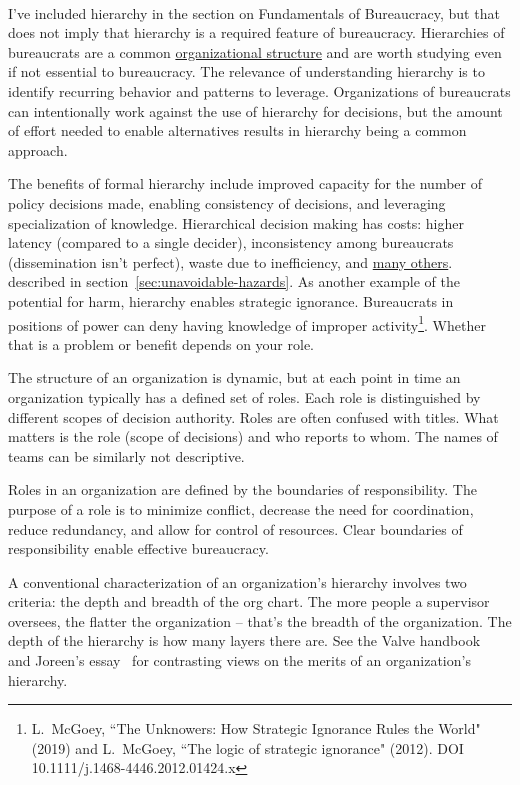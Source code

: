\ \\

I've included hierarchy in the section on Fundamentals of Bureaucracy, but that does not imply that hierarchy is a required feature of bureaucracy. Hierarchies of bureaucrats are a common \href{https://en.wikipedia.org/wiki/Organizational_structure}{organizational structure} and are worth studying even if not essential to bureaucracy. The relevance of understanding hierarchy is to identify recurring behavior and patterns to leverage.
Organizations of bureaucrats can intentionally work against the use of hierarchy for decisions, but the amount of effort needed to enable alternatives results in hierarchy being a common approach.

The benefits of formal hierarchy include improved capacity for the number of policy decisions made, enabling consistency of decisions, and leveraging specialization of knowledge. 
Hierarchical decision making has costs: higher latency (compared to a single decider), inconsistency among bureaucrats (dissemination isn't perfect), waste due to inefficiency, and 
\hyperref[sec:unavoidable-hazards]{many others}.
\ifsectionref
described in section~\ref{sec:unavoidable-hazards}. 
\fi
As another example of the potential for harm, hierarchy enables strategic ignorance. Bureaucrats in positions of power can deny having knowledge of improper activity\footnote{L.~McGoey, ``The Unknowers: How Strategic Ignorance Rules the World" (2019)
and 
L.~McGoey, ``The logic of strategic ignorance" (2012). DOI 
10.1111/j.1468-4446.2012.01424.x
}. Whether that is a problem or benefit depends on your role. 



The structure of an organization is dynamic, but at each point in time an organization typically has a defined set of roles. Each role is distinguished by different scopes of decision authority. 
Roles are often confused with titles. What matters is the role (scope of decisions) and who reports to whom. The names of teams can be similarly not descriptive.




Roles in an organization are defined by the boundaries of responsibility. The purpose of a role is to minimize conflict, decrease the need for coordination, reduce redundancy, and allow for control of resources. Clear boundaries of responsibility  enable effective bureaucracy. 


A conventional characterization of an organization's hierarchy involves two criteria: the depth and breadth of the \gls{org chart}.
The more people a supervisor oversees, the flatter the organization -- that's the breadth of the organization. The depth of the hierarchy is how many layers there are. See the Valve handbook~\cite{2012_Valve} and Joreen's essay~\cite{1972_Joreen} for contrasting views on the merits of an organization's hierarchy. 


